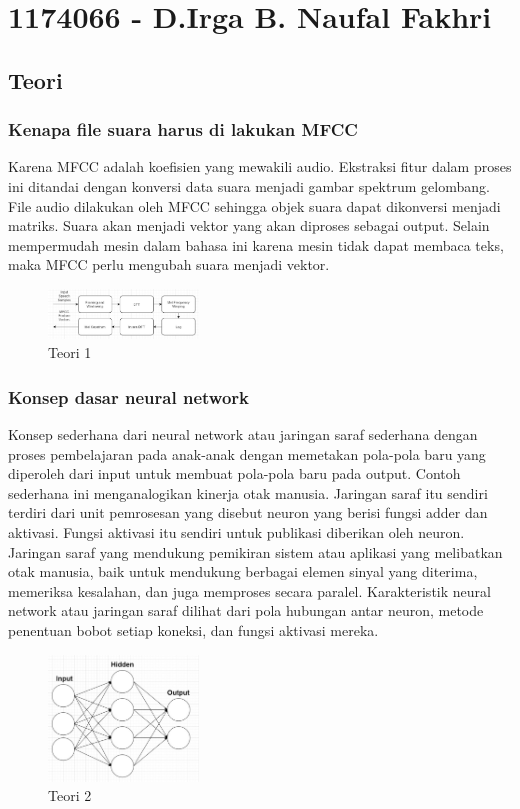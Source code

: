\section{1174066 - D.Irga B. Naufal Fakhri}
\subsection{Teori}
\subsubsection{Kenapa file suara harus di lakukan MFCC}
\hfill\break
Karena MFCC adalah koefisien yang mewakili audio. Ekstraksi fitur dalam proses ini ditandai dengan konversi data suara menjadi gambar spektrum gelombang. File audio dilakukan oleh MFCC sehingga objek suara dapat dikonversi menjadi matriks. Suara akan menjadi vektor yang akan diproses sebagai output. Selain mempermudah mesin dalam bahasa ini karena mesin tidak dapat membaca teks, maka MFCC perlu mengubah suara menjadi vektor.
\begin{figure}[H]
\centering
	\includegraphics[width=4cm]{figures/1174066/6/1.jpg}
\caption{Teori 1}
\end{figure}

\subsubsection{Konsep dasar neural network}
\hfill\break
Konsep sederhana dari neural network atau jaringan saraf sederhana dengan proses pembelajaran pada anak-anak dengan memetakan pola-pola baru yang diperoleh dari input untuk membuat pola-pola baru pada output. Contoh sederhana ini menganalogikan kinerja otak manusia. Jaringan saraf itu sendiri terdiri dari unit pemrosesan yang disebut neuron yang berisi fungsi adder dan aktivasi. Fungsi aktivasi itu sendiri untuk publikasi diberikan oleh neuron. Jaringan saraf yang mendukung pemikiran sistem atau aplikasi yang melibatkan otak manusia, baik untuk mendukung berbagai elemen sinyal yang diterima, memeriksa kesalahan, dan juga memproses secara paralel. Karakteristik neural network atau jaringan saraf dilihat dari pola hubungan antar neuron, metode penentuan bobot setiap koneksi, dan fungsi aktivasi mereka.
\begin{figure}[H]
\centering
	\includegraphics[width=4cm]{figures/1174066/6/2.jpg}
\caption{Teori 2}
\end{figure}

